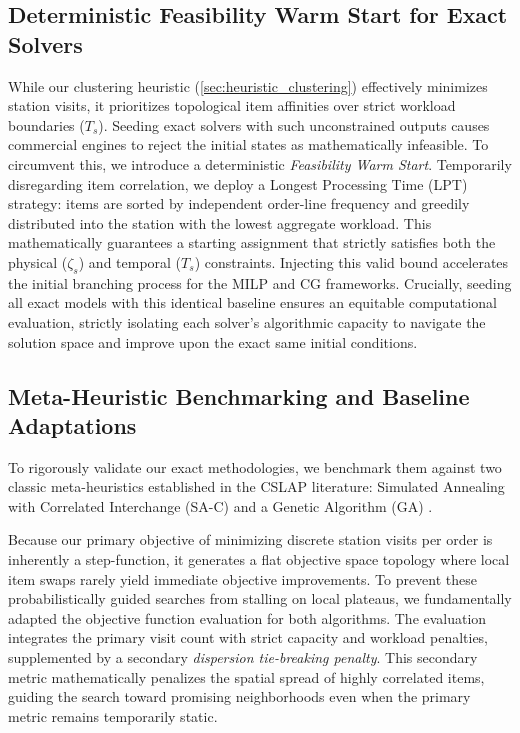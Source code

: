 \documentclass[preprint,review,11pt,authoryear]{elsarticle}
\begin{document}
\subsection{Deterministic Feasibility Warm Start for Exact Solvers}

While our clustering heuristic (\cref{sec:heuristic_clustering}) effectively minimizes station visits, it prioritizes topological item affinities over strict workload boundaries ($T_s$). Seeding exact solvers with such unconstrained outputs causes commercial engines to reject the initial states as mathematically infeasible. To circumvent this, we introduce a deterministic \textit{Feasibility Warm Start}. Temporarily disregarding item correlation, we deploy a Longest Processing Time (LPT) strategy: items are sorted by independent order-line frequency and greedily distributed into the station with the lowest aggregate workload. This mathematically guarantees a starting assignment that strictly satisfies both the physical ($\zeta_s$) and temporal ($T_s$) constraints. Injecting this valid bound accelerates the initial branching process for the MILP and CG frameworks. Crucially, seeding all exact models with this identical baseline ensures an equitable computational evaluation, strictly isolating each solver's algorithmic capacity to navigate the solution space and improve upon the exact same initial conditions.



\subsection{Meta-Heuristic Benchmarking and Baseline Adaptations}
\label{sec:meta_benchmarking}

To rigorously validate our exact methodologies, we benchmark them against two classic meta-heuristics established in the CSLAP literature: Simulated Annealing with Correlated Interchange (SA-C) \cite{kim2012, zhang2019cie} and a Genetic Algorithm (GA) \cite{pan2015}. 

Because our primary objective of minimizing discrete station visits per order is inherently a step-function, it generates a flat objective space topology where local item swaps rarely yield immediate objective improvements. To prevent these probabilistically guided searches from stalling on local plateaus, we fundamentally adapted the objective function evaluation for both algorithms. The evaluation integrates the primary visit count with strict capacity and workload penalties, supplemented by a secondary \textit{dispersion tie-breaking penalty}. This secondary metric mathematically penalizes the spatial spread of highly correlated items, guiding the search toward promising neighborhoods even when the primary metric remains temporarily static.
\end{document}
